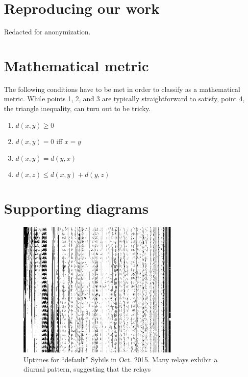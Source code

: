 \appendix

\section{Reproducing our work}
Redacted for anonymization.

\section{Mathematical metric}
\label{sec:metric}
The following conditions have to be met in order to classify as a mathematical
metric.  While points 1, 2, and 3 are typically straightforward to satisfy,
point 4, the triangle inequality, can turn out to be tricky.
\begin{enumerate}
	\item $d(x, y) \geq 0$
	\item $d(x, y) = 0$ iff $x = y$
	\item $d(x, y) = d(y, x)$
	\item $d(x, z) \leq d(x, y) + d(y, z)$
\end{enumerate}

\section{Supporting diagrams}

\begin{figure}[t]
	\centering
	\includegraphics[width=\linewidth]{diagrams/default-sybils-2015-10.jpg}
	\caption{Uptimes for ``default'' Sybils in Oct. 2015.  Many relays exhibit a
	diurnal pattern, suggesting that the relays }
	\label{fig:default-sybils-uptime}
\end{figure}
